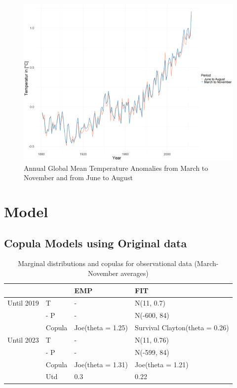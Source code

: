 \documentclass[
]{krantz}
\begin{document}
\begin{figure}

{\centering \includegraphics[width=0.7\linewidth]{work/03-compounds/figures/GMT/GMT} 

}

\caption{Annual Global Mean Temperature Anomalies from March to November and from June to August}\label{fig:gmt-shiyu}
\end{figure}

\section{Model}\label{model-shiyu}

\subsection{Copula Models using Original data}\label{originalmodel-shiyu}

\begin{table}

\caption{\label{tab:tab1-shiyu}Marginal distributions and copulas for observational data (March-November averages)}
\centering
\begin{tabular}[t]{l|l|l|l}
\hline
 &  & EMP & FIT\\
\hline
Until 2019 & T & - & N(11, 0.7)\\
\hline
 & - P & - & N(-600, 84)\\
\hline
 & Copula & Joe(theta = 1.25) & Survival Clayton(theta = 0.26)\\
\hline
Until 2023 & T & - & N(11, 0.76)\\
\hline
 & - P & - & N(-599, 84)\\
\hline
 & Copula & Joe(theta = 1.31) & Joe(theta = 1.21)\\
\hline
 & Utd & 0.3 & 0.22\\
\hline
\end{tabular}
\end{table}
\end{document}
